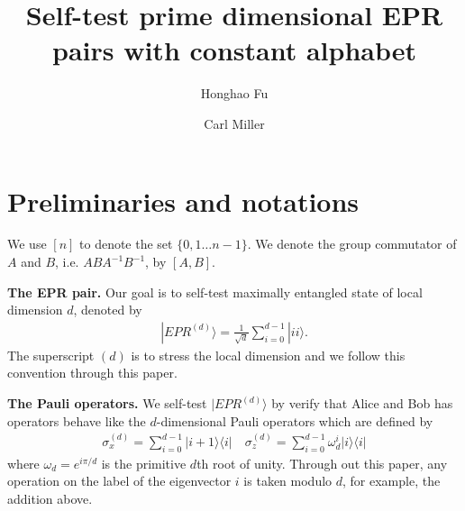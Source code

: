 \documentclass[11pt,letterpaper]{article}
\newcommand{\ket}[1]{|#1\rangle}
\newcommand{\ketbra}[2]{|#1\rangle\langle#2|}
\newcommand{\1}{\mathbb{1}}
\newcommand{\EPR}[1]{EPR^{(#1)}}
\newcommand{\paulix}[1]{\sigma_x^{(#1)}}
\newcommand{\pauliz}[1]{\sigma_z^{(#1)}}
\theoremstyle{definition}
\begin{document}
\title{Self-test prime dimensional EPR pairs with constant alphabet}

\author[1]{Honghao Fu}
\author[1,2]{Carl Miller}

\renewcommand\Affilfont{\itshape\small}


\maketitle
\section{Preliminaries and notations}
We use $[n]$ to denote the set $\{0,1 \dots n-1\}$.
We denote the group commutator of $A$ and $B$, i.e. $ABA^{-1}B^{-1}$, by $[A,B]$.

\textbf{The EPR pair.} Our goal is to self-test maximally entangled state of local dimension $d$, denoted by 
\begin{align}
\ket{\EPR{d}} = \frac{1}{\sqrt{d}} \sum_{i = 0}^{d-1} \ket{ii}.
\end{align}
The superscript $(d)$ is to stress the local dimension and we follow this convention through this paper.

\textbf{The Pauli operators.} 
We self-test $\ket{\EPR{d}}$ by verify that Alice and Bob has operators behave like 
the $d$-dimensional Pauli operators which are defined by
\begin{align}
	\paulix{d} = \sum_{i=0}^{d-1} \ketbra{i+1}{i} \quad \pauliz{d} = \sum_{i=0}^{d-1} \omega_d^i\ketbra{i}{i}
\end{align}
where $\omega_d = e^{i\pi/d}$ is the primitive $d$th root of unity.
Through out this paper, any operation on the label of the eigenvector $i$ is taken modulo $d$,
for example, the addition above.
\end{document}
